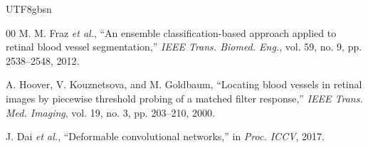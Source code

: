 \documentclass[conference]{IEEEtran}
\begin{document}
\begin{CJK}{UTF8}{gbsn}
\begin{thebibliography}{00}
M. M. Fraz \emph{et al.}, ``An ensemble classification-based approach applied to retinal blood vessel segmentation,'' \emph{IEEE Trans. Biomed. Eng.}, vol. 59, no. 9, pp. 2538--2548, 2012.

A. Hoover, V. Kouznetsova, and M. Goldbaum, ``Locating blood vessels in retinal images by piecewise threshold probing of a matched filter response,'' \emph{IEEE Trans. Med. Imaging}, vol. 19, no. 3, pp. 203--210, 2000.

J. Dai \emph{et al.}, ``Deformable convolutional networks,'' in \emph{Proc. ICCV}, 2017.

\end{thebibliography}

\end{CJK}
\end{document}
